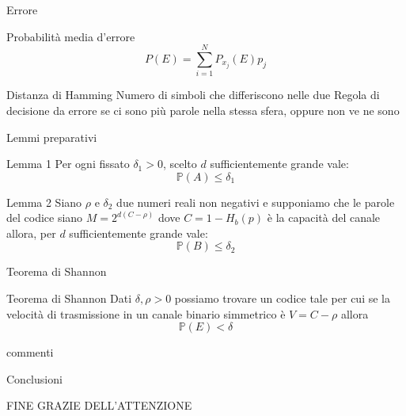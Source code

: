 \documentclass{beamer}
\theoremstyle{definition}
\numberwithin{equation}{section}
\begin{document}
\begin{frame}[t]{Errore} \vspace{5pt}
\begin{block}{Probabilità media d'errore}
$$P(E)=\sum_{i=1}^N P_{x_j}(E)p_j$$
\end{block}
\vspace{20pt}
\begin{block}{Distanza di Hamming}
\vspace{0.5em}
Numero di simboli che differiscono nelle due 
\vspace{0.5em}
Regola di decisione da errore se ci sono più parole nella stessa sfera, oppure non ve ne sono
\end{block}
\end{frame}


\begin{frame}[t]{Lemmi preparativi} \vspace{5pt}
\begin{block}{Lemma 1}
Per ogni fissato $\delta_1>0$, scelto $d$ sufficientemente grande vale:
$$\mathbb{P}(A)\leq \delta_1$$   
\end{block}

\begin{block}{Lemma 2}
Siano $\rho$ e $\delta_2$ due numeri reali non negativi e supponiamo che le parole del codice siano $M=2^{d(C-\rho)}$ dove $C=1-H_b(p)$ è la capacità del canale allora, per $d$ sufficientemente grande vale:
$$\mathbb{P}(B)\leq \delta_2$$
\end{block}
\end{frame}


\begin{frame}[t]{Teorema di Shannon} \vspace{5pt}
\begin{block}{Teorema di Shannon}
\vspace{0.5em}
Dati $\delta , \rho > 0$ possiamo trovare un codice tale per cui se la velocità di trasmissione in un canale binario simmetrico è $V=C-\rho$ allora
$$\mathbb{P}(E)< \delta$$
\vspace{0.5em}
\end{block}
commenti
\end{frame}


\begin{frame}[t]{Conclusioni} \vspace{5pt}

\end{frame}


\begin{frame}[t]{FINE} \vspace{5pt}
GRAZIE DELL'ATTENZIONE
\end{frame}
\end{document}
